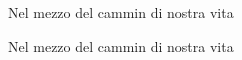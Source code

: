 \documentclass{minimal}
\begin{document}
\begin{minipage}{1sp}
Nel mezzo del cammin di nostra vita
\end{minipage}


\begin{minipage}{1sp}
\hskip1sp Nel mezzo del cammin di nostra vita
\end{minipage}
\end{document}
